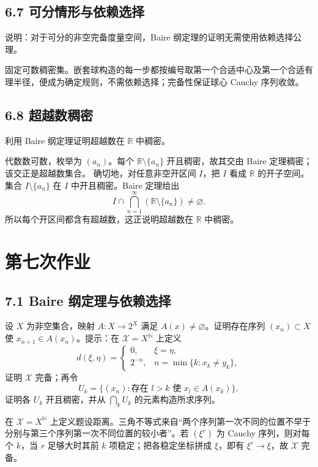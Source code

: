 \subsection*{6.7 可分情形与依赖选择}
\begin{problem}
说明：对于可分的非空完备度量空间，Baire 纲定理的证明无需使用依赖选择公理。
\end{problem}
固定可数稠密集。嵌套球构造的每一步都按编号取第一个合适中心及第一个合适有理半径，便成为确定规则，不需依赖选择；完备性保证球心 Cauchy 序列收敛。

\subsection*{6.8 超越数稠密}
\begin{problem}
利用 Baire 纲定理证明超越数在 $\mathbb R$ 中稠密。
\end{problem}
代数数可数，枚举为 $(a_n)$。每个 $\mathbb R\setminus\{a_n\}$ 开且稠密，故其交由 Baire 定理稠密；该交正是超越数集合。
确切地，对任意非空开区间 $I$，把 $I$ 看成 $\mathbb R$ 的开子空间。集合
$I\setminus\{a_n\}$ 在 $I$ 中开且稠密。Baire 定理给出
\[
I\cap\bigcap_{n=1}^\infty(\mathbb R\setminus\{a_n\})\ne\varnothing.
\]
所以每个开区间都含有超越数，这正说明超越数在 $\mathbb R$ 中稠密。

\section{第七次作业}

\subsection*{7.1 Baire 纲定理与依赖选择}
\begin{problem}
设 $X$ 为非空集合，映射 $A:X\to2^X$ 满足 $A(x)\ne\varnothing$。证明存在序列 $(x_n)\subset X$ 使 $x_{n+1}\in A(x_n)$。提示：在 $\mathcal X=X^{\mathbb N}$ 上定义
\[
d(\xi,\eta)=
\begin{cases}
0,&\xi=\eta,\\
2^{-n},&n=\min\{k:x_k\ne y_k\},
\end{cases}
\]
证明 $\mathcal X$ 完备；再令
\[
U_k=\{(x_n):\text{存在 }l>k\text{ 使 }x_l\in A(x_k)\},
\]
证明各 $U_k$ 开且稠密，并从 $\bigcap_kU_k$ 的元素构造所求序列。
\end{problem}
在 $\mathcal X=X^{\mathbb N}$ 上定义题设距离。三角不等式来自“两个序列第一次不同的位置不早于分别与第三个序列第一次不同位置的较小者”。若 $(\xi^r)$ 为 Cauchy 序列，则对每个 $k$，当 $r$ 足够大时其前 $k$ 项稳定；把各稳定坐标拼成 $\xi$，即有 $\xi^r\to\xi$，故 $\mathcal X$ 完备。

